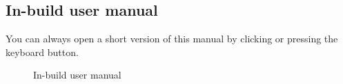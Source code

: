 \documentclass[a5paper, 11pt]{article}
\begin{document}
    \subsection{In-build user manual}
        You can always open a short version of this manual by clicking  or pressing the  keyboard button.
        \begin{figure}[h]
            \centering
            \caption{In-build user manual}
            \label{pic:"in-build_use_manual"}
        \end{figure}

\pagebreak
\end{document}

